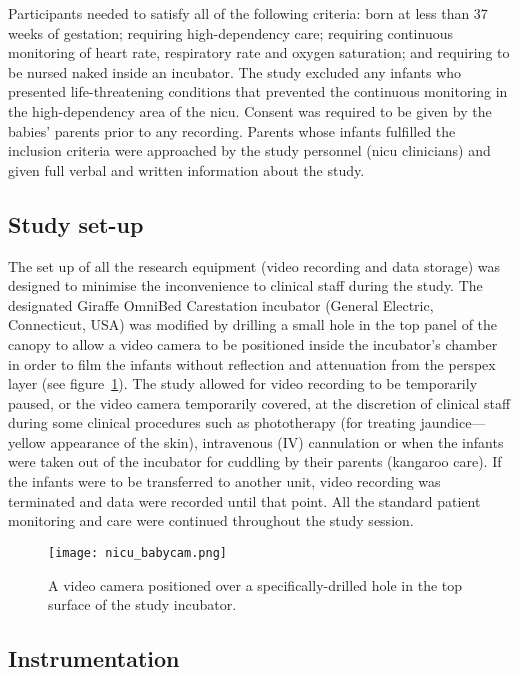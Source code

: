 Participants needed to satisfy all of the following criteria: born at less than 37 weeks of gestation; requiring high-dependency care; requiring continuous monitoring of heart rate, respiratory rate and oxygen saturation; and requiring to be nursed naked inside an incubator. The study excluded any infants who presented life-threatening conditions that prevented the continuous monitoring in the high-dependency area of the \gls{nicu}. Consent was required to be given by the babies’ parents prior to any recording. Parents whose infants fulfilled the inclusion criteria were approached by the study personnel (\gls{nicu} clinicians) and given full verbal and written information about the study.

\subsection{Study set-up}

The set up of all the research equipment (video recording and data storage) was designed to minimise the inconvenience to clinical staff during the study. The designated Giraffe OmniBed Carestation incubator (General Electric, Connecticut, USA) was modified by drilling a small hole in the top panel of the canopy to allow a video camera to be positioned inside the incubator's chamber in order to film the infants without reflection and attenuation from the perspex layer (see figure~\ref{babycam}).  The study allowed for video recording to be temporarily paused, or the video camera temporarily covered, at the discretion of clinical staff during some clinical procedures such as phototherapy (for treating jaundice—yellow appearance of the skin), intravenous (IV) cannulation or when the infants were taken out of the incubator for cuddling by their parents (kangaroo care). If the infants were to be transferred to another unit, video recording was terminated and data were recorded until that point.
All the standard patient monitoring and care were continued throughout the study session.

\begin{figure}[!ht]
    \centering
\texttt{[image: nicu\_babycam.png]}
    \caption{A video camera positioned over a specifically-drilled hole in the top surface of the study incubator.}
    \label{babycam}
\end{figure}

\subsection{Instrumentation}

